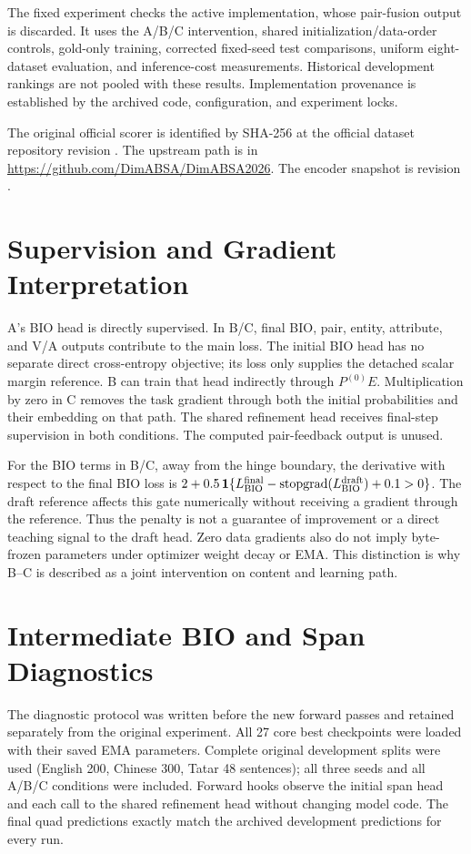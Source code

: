 \documentclass[10pt]{article}
\begin{document}
The fixed experiment checks the active implementation, whose pair-fusion output is discarded. It uses the A/B/C intervention, shared initialization/data-order controls, gold-only training, corrected fixed-seed test comparisons, uniform eight-dataset evaluation, and inference-cost measurements. Historical development rankings are not pooled with these results. Implementation provenance is established by the archived code, configuration, and experiment locks.

The original official scorer is identified by SHA-256
at the official dataset repository revision
.
The upstream path is  in
\url{https://github.com/DimABSA/DimABSA2026}. The encoder snapshot is
 revision
.

\section{Supervision and Gradient Interpretation}
A's BIO head is directly supervised. In B/C, final BIO, pair, entity, attribute, and V/A outputs contribute to the main loss. The initial BIO head has no separate direct cross-entropy objective; its loss only supplies the detached scalar margin reference. B can train that head indirectly through $P^{(0)}E$. Multiplication by zero in C removes the task gradient through both the initial probabilities and their embedding on that path. The shared refinement head receives final-step supervision in both conditions. The computed pair-feedback output is unused.

For the BIO terms in B/C, away from the hinge boundary, the derivative with respect to the final BIO loss is $2+0.5\,\mathbf{1}\{L_{\rm BIO}^{\rm final}-\mathrm{stopgrad}(L_{\rm BIO}^{\rm draft})+0.1>0\}$. The draft reference affects this gate numerically without receiving a gradient through the reference. Thus the penalty is not a guarantee of improvement or a direct teaching signal to the draft head. Zero data gradients also do not imply byte-frozen parameters under optimizer weight decay or EMA. This distinction is why B--C is described as a joint intervention on content and learning path.

\section{Intermediate BIO and Span Diagnostics}
The diagnostic protocol was written before the new forward passes and retained separately from the original experiment. All 27 core best checkpoints were loaded with their saved EMA parameters. Complete original development splits were used (English 200, Chinese 300, Tatar 48 sentences); all three seeds and all A/B/C conditions were included. Forward hooks observe the initial span head and each call to the shared refinement head without changing model code. The final quad predictions exactly match the archived development predictions for every run.
\end{document}
